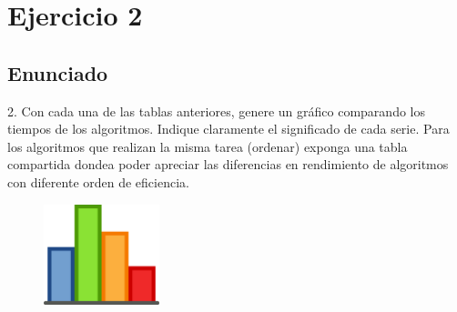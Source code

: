 \documentclass[compress]{beamer}
\begin{document}

\section{Ejercicio 2}
\subsection{Enunciado}

\begin{frame}
	2. Con cada una de las tablas anteriores, genere un gráfico comparando los tiempos  de
los algoritmos. Indique claramente el significado de cada serie. Para los algoritmos que
realizan la misma tarea (ordenar) exponga una tabla compartida dondea poder apreciar las diferencias en rendimiento de algoritmos con diferente orden de
eficiencia.
	\begin{figure}
  \centering
    \includegraphics[width=0.3\textwidth]{graf.png}
  \label{fig:ejemplo}
\end{figure}
\end{frame}
\end{document}
